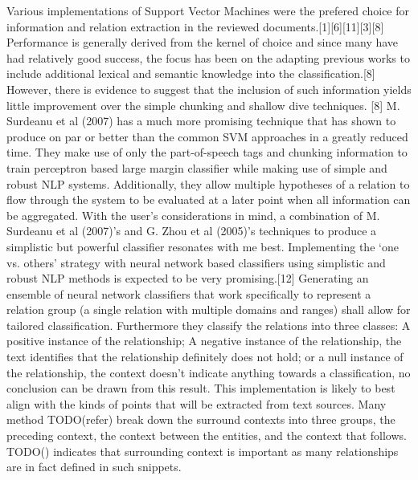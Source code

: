 \documentclass[11pt]{article} %
\begin{document}
Various implementations of Support Vector Machines were the prefered choice for information and relation extraction in the reviewed documents.[1][6][11][3][8] Performance is generally derived from the kernel of choice and since many have had relatively good success, the focus has been on the adapting previous works to include additional lexical and semantic knowledge into the classification.[8] However, there is evidence to suggest that the inclusion of such information yields little improvement over the simple chunking and shallow dive techniques. [8] M. Surdeanu et al (2007) has a much more promising technique that has shown to produce on par or better than the common SVM approaches in a greatly reduced time. They make use of only the part-of-speech tags and chunking information to train perceptron based large margin classifier while making use of simple and robust NLP systems. Additionally, they allow multiple hypotheses of a relation to flow through the system to be evaluated at a later point when all information can be aggregated. With the user’s considerations in mind, a combination of M. Surdeanu et al (2007)’s and G. Zhou et al (2005)’s techniques to produce a simplistic but powerful classifier resonates with me best. Implementing the ‘one vs. others’ strategy with neural network based classifiers using simplistic and robust NLP methods is expected to be very promising.[12] Generating an ensemble of neural network classifiers that work specifically to represent a relation group (a single relation with multiple domains and ranges) shall allow for tailored classification. Furthermore they classify the relations into three classes: A positive instance of the relationship; A negative instance of the relationship, the text identifies that the relationship definitely does not hold; or a null instance of the relationship, the context doesn’t indicate anything towards a classification, no conclusion can be drawn from this result. This implementation is likely to best align with the kinds of points that will be extracted from text sources. Many method TODO(refer) break down the surround contexts into three groups, the preceding context, the context between the entities, and the context that follows. TODO() indicates that surrounding context is important as many relationships are in fact defined in such snippets.
\end{document}

